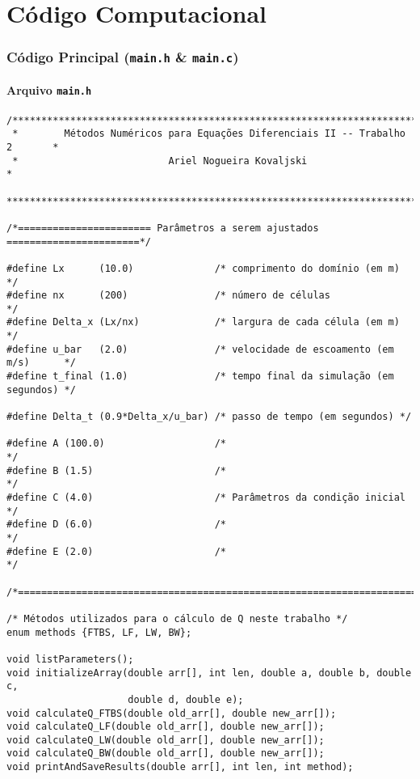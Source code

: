 \chapter{Código Computacional}

\subsection{Código Principal (\texttt{main.h} \& \texttt{main.c})}

\subsubsection{Arquivo \texttt{main.h}}

\begin{Verbatim}[fontsize=\footnotesize]
/******************************************************************************
 *        Métodos Numéricos para Equações Diferenciais II -- Trabalho 2       *
 *                          Ariel Nogueira Kovaljski                          *
 ******************************************************************************/

/*======================= Parâmetros a serem ajustados =======================*/

#define Lx      (10.0)              /* comprimento do domínio (em m)          */
#define nx      (200)               /* número de células                      */
#define Delta_x (Lx/nx)             /* largura de cada célula (em m)          */
#define u_bar   (2.0)               /* velocidade de escoamento (em m/s)      */
#define t_final (1.0)               /* tempo final da simulação (em segundos) */

#define Delta_t (0.9*Delta_x/u_bar) /* passo de tempo (em segundos) */

#define A (100.0)                   /*                                */
#define B (1.5)                     /*                                */
#define C (4.0)                     /* Parâmetros da condição inicial */
#define D (6.0)                     /*                                */
#define E (2.0)                     /*                                */

/*============================================================================*/

/* Métodos utilizados para o cálculo de Q neste trabalho */
enum methods {FTBS, LF, LW, BW};

void listParameters();
void initializeArray(double arr[], int len, double a, double b, double c,
                     double d, double e);
void calculateQ_FTBS(double old_arr[], double new_arr[]);
void calculateQ_LF(double old_arr[], double new_arr[]);
void calculateQ_LW(double old_arr[], double new_arr[]);
void calculateQ_BW(double old_arr[], double new_arr[]);
void printAndSaveResults(double arr[], int len, int method);
\end{Verbatim}

